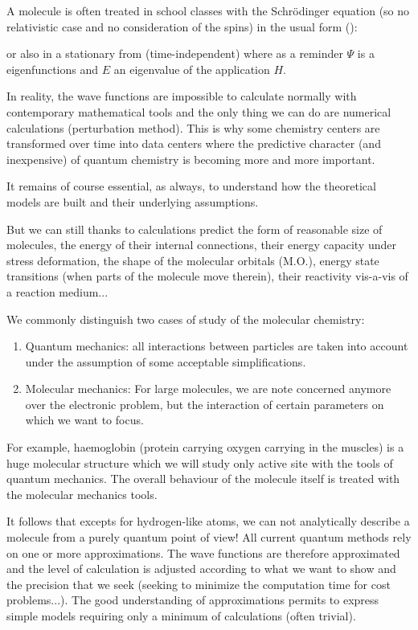 	A molecule is often treated in school classes with the Schrödinger equation (so no relativistic case and no consideration of the spins) in the usual form ():
	
	or also in a stationary from (time-independent) where as a reminder $\Psi$ is a eigenfunctions and $E$ an eigenvalue of the application $H$.
	
	In reality, the wave functions are impossible to calculate normally with contemporary mathematical tools and the only thing we can do are numerical calculations (perturbation method). This is why some chemistry centers are transformed over time into data centers where the predictive character (and inexpensive) of quantum chemistry is becoming more and more important.
	
	It remains of course essential, as always, to understand how the theoretical models are built and their underlying assumptions.
	
	But we can still thanks to calculations predict the form of reasonable size of molecules, the energy of their internal connections, their energy capacity under stress deformation, the shape of the molecular orbitals (M.O.), energy state transitions (when parts of the molecule move therein), their reactivity vis-a-vis of a reaction medium...
	
	We commonly distinguish two cases of study of the molecular chemistry:
	\begin{enumerate}
		\item Quantum mechanics: all interactions between particles are taken into account under the assumption of some acceptable simplifications.
		\item Molecular mechanics: For large molecules, we are note concerned anymore over the electronic problem, but the interaction of certain parameters on which we want to focus.
	\end{enumerate}
	For example, haemoglobin (protein carrying oxygen carrying in the muscles) is a huge molecular structure which we will study only active site with the tools of quantum mechanics. The overall behaviour of the molecule itself is treated with the molecular mechanics tools.
	
	It follows that excepts for hydrogen-like atoms, we can not analytically describe a molecule from a purely quantum point of view! All current quantum methods rely on one or more approximations. The wave functions are therefore approximated and the level of calculation is adjusted according to what we want to show and the precision that we seek (seeking to minimize the computation time for cost problems...). The good understanding of approximations permits to express simple models requiring only a minimum of calculations (often trivial).
	
